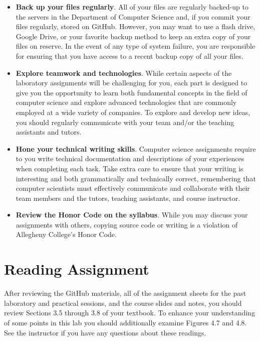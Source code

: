 \documentclass[11pt]{article}
\begin{document}
\begin{itemize}
\item {\bf Back up your files regularly}. All of your files are regularly backed-up to the servers in the Department of
  Computer Science and, if you commit your files regularly, stored on GitHub. However, you may want to use a flash
  drive, Google Drive, or your favorite backup method to keep an extra copy of your files on reserve. In the event of
  any type of system failure, you are responsible for ensuring that you have access to a recent backup copy of all your
  files.

\item {\bf Explore teamwork and technologies}. While certain aspects of the laboratory assignments will be challenging
  for you, each part is designed to give you the opportunity to learn both fundamental concepts in the field of computer
  science and explore advanced technologies that are commonly employed at a wide variety of companies. To explore and
  develop new ideas, you should regularly communicate with your team and/or the teaching assistants and tutors.

\item {\bf Hone your technical writing skills}. Computer science assignments require to you write technical
  documentation and descriptions of your experiences when completing each task. Take extra care to ensure that your
  writing is interesting and both grammatically and technically correct, remembering that computer scientists must
  effectively communicate and collaborate with their team members and the tutors, teaching assistants, and course
  instructor.

\item {\bf Review the Honor Code on the syllabus}. While you may discuss your assignments with others, copying source
  code or writing is a violation of Allegheny College's Honor Code.

\end{itemize}

\section*{Reading Assignment}

After reviewing the GitHub materials, all of the assignment sheets for the past laboratory and practical sessions, and
the course slides and notes, you should review Sections 3.5 through 3.8 of your textbook. To enhance your understanding
of some points in this lab you should additionally examine Figures 4.7 and 4.8. See the instructor if you have any
questions about these readings.
\end{document}
